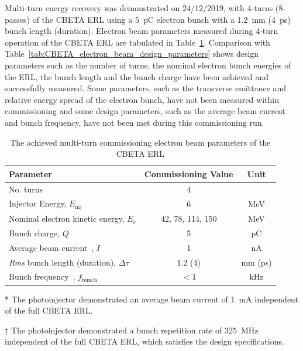 \documentclass[../main.tex]{subfiles}
\begin{document}
Multi-turn energy recovery was demonstrated \cite{bartnik2020cbeta} on 24/12/2019, with 4-turns (8-passes) of the CBETA ERL using a 5~\si{\pico\coulomb} electron bunch with a 1.2~\si{\milli\meter} (4~\si{\pico\second}) bunch length (duration). Electron beam parameters measured during 4-turn operation of the CBETA ERL are tabulated in Table~\ref{tab:CBETA_ERL_commissioning_parameters}. Comparison with Table~\ref{tab:CBETA_electron_beam_design_parameters} shows design parameters such as the number of turns, the nominal electron bunch energies of the ERL, the bunch length and the bunch charge have been achieved and successfully measured. Some parameters, such as the transverse emittance and relative energy spread of the electron bunch, have not been measured within commissioning and some design parameters, such as the average beam current and bunch frequency, have not been met during this commissioning run.
\begin{table}[!h]
\centering
\caption{The achieved multi-turn commissioning electron beam parameters of the CBETA ERL\cite{bartnik}}
\vspace{3mm}
\begin{threeparttable}
\begin{tabular}{lcc}
\hline\hline
Parameter & Commissioning Value & Unit \\
\hline
No. turns & 4 &  \\
Injector Energy, $E_{\mathrm{inj}}$ & 6 & \si{\mega\electronvolt} \\
Nominal electron kinetic energy, $E_{e}$ & 42, 78, 114, 150 & \si{\mega\electronvolt} \\
Bunch charge, $Q$ & 5 & \si{\pico\coulomb} \\ 
Average beam current\tnote{*}~, $I$ & 1 & \si{\nano\ampere} \\
\textit{Rms} bunch length (duration), $\Delta\tau$ & 1.2 (4) & \si{\milli\meter} (\si{\pico\second}) \\
Bunch frequency\tnote{$\dagger$}~, $f_{\mathrm{bunch}}$ & $< 1$ & \si{\kilo\hertz} \\
\hline
\end{tabular}
\begin{tablenotes}
\item[*]{The photoinjector demonstrated an average beam current of 1~\si{\milli\ampere} independent of the full CBETA ERL.}
\item[$\dagger$]{The photoinjector demonstrated a bunch repetition rate of 325~\si{\mega\hertz} independent of the full CBETA ERL, which satisfies the design specifications.}
\end{tablenotes}
\end{threeparttable}
\label{tab:CBETA_ERL_commissioning_parameters}
\end{table}
\end{document}
